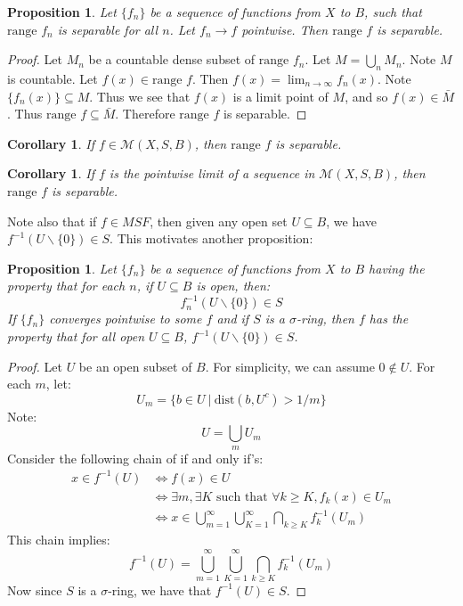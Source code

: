 \documentclass[a4paper,12pt]{report}
\newcommand{\ms}[1]{\mathscr{#1}}
\newcommand{\range}{ \text{range } }
\newcommand{\inv}[1] { #1^{-1} }
\newcommand{\sse} {\subseteq}
\newtheorem{corollary}[theorem]{Corollary}
\newtheorem{prop}[theorem]{Proposition}
\begin{document}
	\begin{prop}
	Let $\{f_n\}$ be a sequence of functions from $X$ to $B$, such that $\range f_n$ is separable for all $n$. Let $f_n \rightarrow f$ pointwise. Then $\range f$ is separable. 
	\end{prop}
	\begin{proof}
	Let $M_n$ be a countable dense subset of $\range f_n$. Let $M = \bigcup_n M_n$. Note $M$ is countable. Let $f(x) \in \range f$. Then $f(x) = \lim_{n \rightarrow \infty} f_n(x)$. Note $\{f_n(x)\} \sse M$. Thus we see that $f(x)$ is a limit point of $M$, and so $f(x) \in \bar{M}$. Thus $\range f \sse \bar{M}$. Therefore $\range f$ is separable. 
	\end{proof}
	
	\begin{corollary}
	If $f \in \ms{M}(X, S, B)$, then $\range f$ is separable.
	\end{corollary}
	
	\begin{corollary}
	If $f$ is the pointwise limit of a sequence in $\ms{M}(X, S, B)$, then $\range f$ is separable. 
	\end{corollary}
	
	\noindent Note also that if $f \in MSF$, then given any open set $U \sse B$, we have $\inv{f}(U \backslash \{0\}) \in S$. This motivates another proposition:
	 
	\begin{prop}
	Let $\{f_n\}$ be a sequence of functions from $X$ to $B$ having the property that for each $n$, if $U \sse B$ is open, then:
	\[ \inv{f_n}(U \backslash \{0\}) \in S \]
	If $\{f_n\}$ converges pointwise to some $f$ and if $S$ is a $\sigma$-ring, then $f$ has the property that for all open $U \sse B$, $\inv{f}(U \backslash \{0\}) \in S$. 
	\end{prop}
	\begin{proof}
	Let $U$ be an open subset of $B$. For simplicity, we can assume $0 \notin U$. For each $m$, let:
	\[ U_m = \{b \in U ~|~ \text{dist}(b, U^c) >  1/m \} \]
	Note:
	\[ U = \bigcup_m U_m \]
	Consider the following chain of if and only if's:
	\begin{align*}
	x \in \inv{f}(U) &\Longleftrightarrow f(x) \in U \\
	& \Longleftrightarrow \exists m, \exists K \text{ such that } \forall k \geq K, f_k(x) \in U_m \\
	& \Longleftrightarrow x \in \bigcup_{m=1}^\infty \bigcup_{K=1}^\infty \bigcap_{k \geq K} \inv{f_k}(U_m)
	\end{align*}
	This chain implies:
	\[ \inv{f}(U) = \bigcup_{m=1}^\infty \bigcup_{K=1}^\infty \bigcap_{k \geq K} \inv{f_k}(U_m) \]
	Now since $S$ is a $\sigma$-ring, we have that $\inv{f}(U) \in S$. 
	\end{proof}
	
\end{document}
